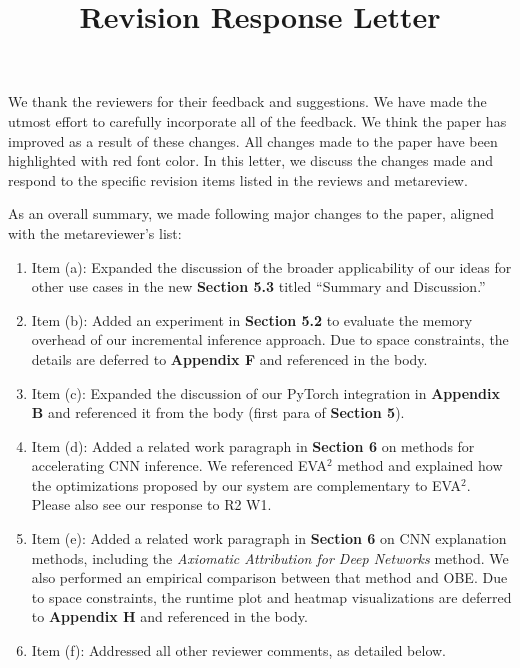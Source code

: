 \documentclass[preprint]{vldb}
\title{Revision Response Letter}
\author{}
\begin{document}
\maketitle

We thank the reviewers for their feedback and suggestions.
We have made the utmost effort to carefully incorporate all of the feedback. 
We think the paper has improved as a result of these changes.
All changes made to the paper have been highlighted with red font color.
In this letter, we discuss the changes made and respond to the specific revision items listed in the reviews and metareview.

As an overall summary, we made following major changes to the paper, aligned with the metareviewer's list:
\begin{enumerate}

	\item Item (a): Expanded the discussion of the broader applicability of our ideas for other use cases in the new \textbf{Section 5.3} titled ``Summary and Discussion.''

	\item Item (b): Added an experiment in \textbf{Section 5.2} to evaluate the memory overhead of our incremental inference approach. Due to space constraints, the details are deferred to \textbf{Appendix F} and referenced in the body.

	\item Item (c): Expanded the discussion of our PyTorch integration in \textbf{Appendix B} and referenced it from the body (first para of \textbf{Section 5}).

	\item Item (d): Added a related work paragraph in \textbf{Section 6} on methods for accelerating CNN inference. We referenced EVA$^2$ method and explained how the optimizations proposed by our system are complementary to EVA$^2$. Please also see our response to R2 W1.

	\item Item (e): Added a related work paragraph in \textbf{Section 6} on CNN explanation methods, including the \textit{Axiomatic Attribution for Deep Networks} method. We also performed an empirical comparison between that method and OBE. Due to space constraints, the runtime plot and heatmap visualizations are deferred to \textbf{Appendix H} and referenced in the body.
	
	\item Item (f): Addressed all other reviewer comments, as detailed below.
	
\end{enumerate}
\end{document}
